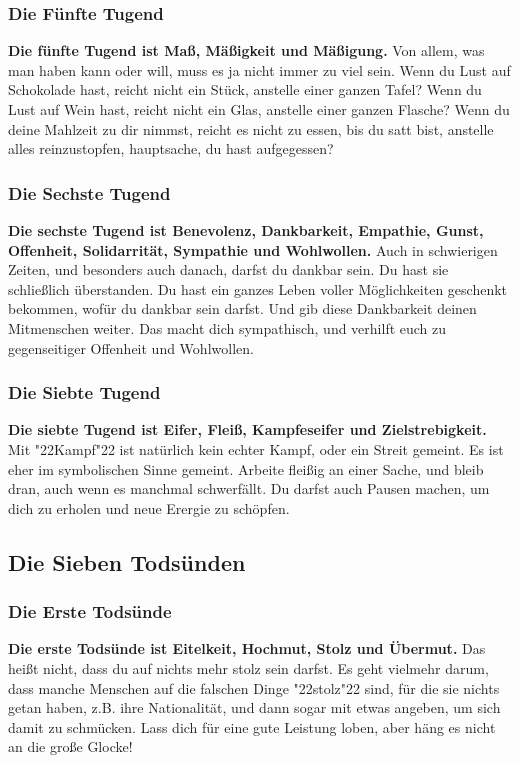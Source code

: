 \documentclass[12pt,a5paper]{article}
\newcommand{\q}[1]{\char"22{#1}\char"22 }
\begin{document}
	\subsubsection{Die F\"unfte Tugend}
		\textbf{Die f\"unfte Tugend ist Ma{\ss},
		M\"a{\ss}igkeit und M\"a{\ss}igung.}
		Von allem,
		was man haben kann oder will,
		muss es ja nicht immer zu viel sein.
		Wenn du Lust auf Schokolade hast,
		reicht nicht ein St\"uck,
		anstelle einer ganzen Tafel?
		Wenn du Lust auf Wein hast,
		reicht nicht ein Glas,
		anstelle einer ganzen Flasche?
		Wenn du deine Mahlzeit zu dir nimmst,
		reicht es nicht zu essen,
		bis du satt bist,
		anstelle alles reinzustopfen,
		hauptsache,
		du hast aufgegessen?		

	\subsubsection{Die Sechste Tugend}
		\textbf{Die sechste Tugend ist Benevolenz,
		Dankbarkeit,
		Empathie,
		Gunst,
		Offenheit,
		Solidarrit\"at,
		Sympathie und Wohlwollen.}
		Auch in schwierigen Zeiten,
		und besonders auch danach,
		darfst du dankbar sein.
		Du hast sie schlie{\ss}lich \"uberstanden.
		Du hast ein ganzes Leben voller M\"oglichkeiten geschenkt bekommen,
		wof\"ur du dankbar sein darfst.
		Und gib diese Dankbarkeit deinen Mitmenschen weiter.
		Das macht dich sympathisch,
		und verhilft euch zu gegenseitiger Offenheit und Wohlwollen.
	
	\subsubsection{Die Siebte Tugend}
		\textbf{Die siebte Tugend ist Eifer,
		Flei{\ss},
		Kampfeseifer und Zielstrebigkeit.}
		Mit \q{Kampf} ist nat\"urlich kein echter Kampf,
		oder ein Streit gemeint.
		Es ist eher im symbolischen Sinne gemeint.
		Arbeite flei{\ss}ig an einer Sache,
		und bleib dran,
		auch wenn es manchmal schwerf\"allt.
		Du darfst auch Pausen machen,
		um dich zu erholen und neue Erergie zu sch\"opfen.

	\subsection{Die Sieben Tods\"unden}
	
	\subsubsection{Die Erste Tods\"unde}
		\textbf{Die erste Tods\"unde ist Eitelkeit,
		Hochmut,
		Stolz und \"Ubermut.}
		Das hei{\ss}t nicht,
		dass du auf nichts mehr stolz sein darfst.
		Es geht vielmehr darum,
		dass manche Menschen auf die falschen Dinge \q{stolz} sind,
		f\"ur die sie nichts getan haben,
		z.B. ihre Nationalit\"at,
		und dann sogar mit etwas angeben,
		um sich damit zu schm\"ucken.
		Lass dich f\"ur eine gute Leistung loben,
		aber h\"ang es nicht an die gro{\ss}e Glocke!
\end{document}
